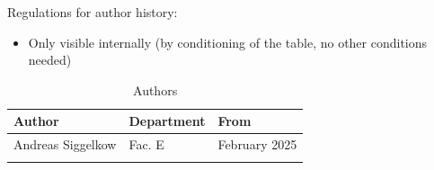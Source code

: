 Regulations for author history:
\begin{itemize}
  \item Only visible internally (by conditioning of the table, no other conditions needed)
\end{itemize}

\begin{table}[H]
\caption{Authors}
\label{tab:decauth01}
\centering
\begin{tabularx}{\textwidth}{|X |X |X |}
  \hline
  Author & Department & From \\
  \hline
  \hline
  Andreas Siggelkow & Fac. E & February 2025 \\
  \hline
  && \\
  \hline
\end{tabularx}
\end{table}
